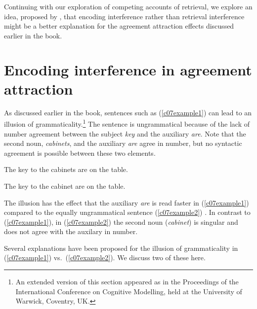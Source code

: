 \documentclass{cambridge7A}\usepackage[]{graphicx}\usepackage[]{color}
\begin{document}
Continuing with our exploration of  competing accounts of retrieval, we explore an idea, proposed by \cite{VillataFranck}, that  encoding interference rather  than retrieval interference might be a better explanation for the agreement attraction effects discussed earlier in the book.

\section{Encoding interference in agreement attraction} \label{encint}

As discussed earlier in the book, sentences such as (\ref{c07example1}) can lead to an  illusion of grammaticality.\footnote{An  extended version of this section appeared as \cite{VasishthEtAlICCM2017} in the Proceedings of the International Conference on Cognitive Modelling, held at the University of Warwick, Coventry, UK.}
The sentence is
ungrammatical because of the lack of number agreement between
the subject \textit{key} and the auxiliary \textit{are}.
Note that the second noun, \textit{cabinets}, and the auxiliary \textit{are} agree in number, but no syntactic agreement is possible between these two elements.

\begin{exe} 
\ex
\begin{xlist}
\item \label{c07example1}
The key to the cabinets are on the table.
\item \label{c07example2}
The key to the cabinet are on the table.
\end{xlist}
\end{exe}

The illusion has the effect that
 the auxiliary \textit{are} is read faster in (\ref{c07example1}) compared to the equally ungrammatical sentence (\ref{c07example2}) \citep[see][for a review]{JaegerEngelmannVasishth2017}. In contrast to (\ref{c07example1}), in (\ref{c07example2}) the second noun (\textit{cabinet}) is singular and does not agree with the auxilary in number.

Several explanations have been proposed for the illusion of grammaticality in (\ref{c07example1}) vs.\ (\ref{c07example2}).
We discuss two of these here.
\end{document}
